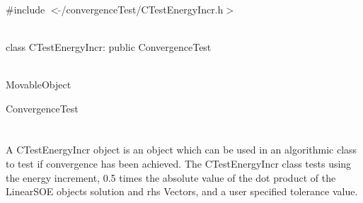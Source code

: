 
   \\
\#include $<\tilde{}$/convergenceTest/CTestEnergyIncr.h$>$  


  \\
class CTestEnergyIncr: public ConvergenceTest  


 \\
MovableObject 

\indent\indent ConvergenceTest \\
\indent\indent{} \\

  \\
\indent A CTestEnergyIncr object is an object which can be used in an
algorithmic class to test if convergence has been achieved. The
CTestEnergyIncr class tests using the energy increment, 0.5 times the
absolute value of the dot product of the LinearSOE objects solution
and rhs Vectors, and a user specified tolerance value. \\


 \\
\indent{}  \\ 
\indent{}  \\  
\indent{}  \\ \\
\indent{}  \\ 
\indent{} \\ \\
\indent{}  \\ 
\indent{} \\
\indent{} \\
\indent{} \\
\indent{} \\
\indent{}\\ 
\indent{}\\ 

